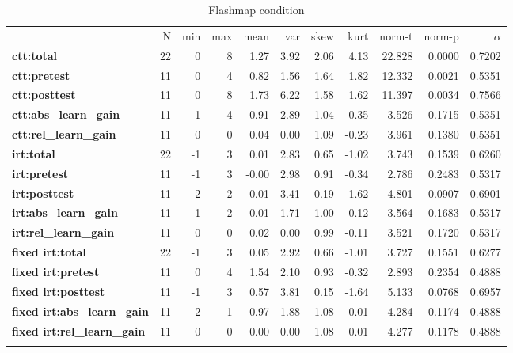 \begin{longtable}[c]{@{}lrrrrrrrrrr@{}}
\caption{Flashmap condition}
\endfirsthead
\endhead
\toprule\addlinespace
& N & min & max & mean & var & skew & kurt & norm-t &
norm-p & $\alpha$
\\\addlinespace
\midrule
\textbf{ctt:total} & 22 & 0 & 8 & 1.27 & 3.92 & 2.06 & 4.13 & 22.828 &
0.0000 & 0.7202
\\\addlinespace
\textbf{ctt:pretest} & 11 & 0 & 4 & 0.82 & 1.56 & 1.64 & 1.82 & 12.332 &
0.0021 & 0.5351
\\\addlinespace
\textbf{ctt:posttest} & 11 & 0 & 8 & 1.73 & 6.22 & 1.58 & 1.62 & 11.397
& 0.0034 & 0.7566
\\\addlinespace
\textbf{ctt:abs\_learn\_gain} & 11 & -1 & 4 & 0.91 & 2.89 & 1.04 & -0.35
& 3.526 & 0.1715 & 0.5351
\\\addlinespace
\textbf{ctt:rel\_learn\_gain} & 11 & 0 & 0 & 0.04 & 0.00 & 1.09 & -0.23
& 3.961 & 0.1380 & 0.5351
\\\addlinespace
\textbf{irt:total} & 22 & -1 & 3 & 0.01 & 2.83 & 0.65 & -1.02 & 3.743 &
0.1539 & 0.6260
\\\addlinespace
\textbf{irt:pretest} & 11 & -1 & 3 & -0.00 & 2.98 & 0.91 & -0.34 & 2.786
& 0.2483 & 0.5317
\\\addlinespace
\textbf{irt:posttest} & 11 & -2 & 2 & 0.01 & 3.41 & 0.19 & -1.62 & 4.801
& 0.0907 & 0.6901
\\\addlinespace
\textbf{irt:abs\_learn\_gain} & 11 & -1 & 2 & 0.01 & 1.71 & 1.00 & -0.12
& 3.564 & 0.1683 & 0.5317
\\\addlinespace
\textbf{irt:rel\_learn\_gain} & 11 & 0 & 0 & 0.02 & 0.00 & 0.99 & -0.11
& 3.521 & 0.1720 & 0.5317
\\\addlinespace
\textbf{fixed irt:total} & 22 & -1 & 3 & 0.05 & 2.92 & 0.66 & -1.01 &
3.727 & 0.1551 & 0.6277
\\\addlinespace
\textbf{fixed irt:pretest} & 11 & 0 & 4 & 1.54 & 2.10 & 0.93 & -0.32
& 2.893 & 0.2354 & 0.4888
\\\addlinespace
\textbf{fixed irt:posttest} & 11 & -1 & 3 & 0.57 & 3.81 & 0.15 &
-1.64 & 5.133 & 0.0768 & 0.6957
\\\addlinespace
\textbf{fixed irt:abs\_learn\_gain} & 11 & -2 & 1 & -0.97 & 1.88 &
1.08 & 0.01 & 4.284 & 0.1174 & 0.4888
\\\addlinespace
\textbf{fixed irt:rel\_learn\_gain} & 11 & 0 & 0 & 0.00 & 0.00 & 1.08
& 0.01 & 4.277 & 0.1178 & 0.4888
\\\addlinespace
\bottomrule
    \label{tab:comp_fm}
\end{longtable}

